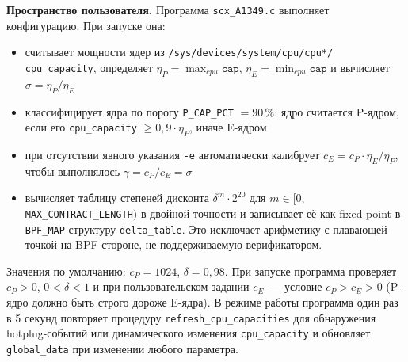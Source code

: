\documentclass[14pt, oneside]{extbook}
\begin{document}
        \textbf{Пространство пользователя.}
        Программа \texttt{scx\_A1349.c} выполняет
        конфигурацию. При запуске она:
        \begin{itemize}
                \item считывает мощности ядер из
                        \texttt{/sys/devices/system/cpu/cpu*/}
                        \texttt{cpu\_capacity},
                        определяет
                        $\eta_P = \max_{cpu} \texttt{cap}$,
                        $\eta_E = \min_{cpu} \texttt{cap}$ и
                        вычисляет $\sigma = \eta_P/\eta_E$
                \item классифицирует ядра по порогу
                        \texttt{P\_CAP\_PCT} $= 90\,\%$: ядро
                        считается P-ядром, если его
                        \texttt{cpu\_capacity} $\geq 0{,}9
                        \cdot \eta_P$, иначе E-ядром
                \item при отсутствии явного указания
                        \texttt{-e} автоматически калибрует
                        $c_E = c_P \cdot \eta_E / \eta_P$,
                        чтобы выполнялось
                        $\gamma = c_P/c_E = \sigma$
                \item вычисляет таблицу степеней дисконта
                        $\delta^m \cdot 2^{20}$ для
                        $m \in [0,$
                        \texttt{MAX\_\allowbreak CONTRACT\_\allowbreak LENGTH}$)$
                        в двойной точности и записывает её
                        как fixed-point в
                        \texttt{BPF\_\allowbreak MAP}-структуру
                        \texttt{delta\_\allowbreak table}. Это исключает
                        арифметику с плавающей точкой на
                        BPF-стороне, не поддерживаемую
                        верификатором.
        \end{itemize}
        Значения по умолчанию: $c_P = 1024$, $\delta = 0{,}98$.
        При запуске программа проверяет $c_P > 0$, $0 < \delta < 1$
        и при пользовательском задании $c_E$~--- условие
        $c_P > c_E > 0$ (P-ядро должно быть строго дороже
        E-ядра). В режиме работы программа один раз в 5 секунд
        повторяет процедуру \texttt{refresh\_cpu\_capacities}
        для обнаружения hotplug-событий или динамического
        изменения \texttt{cpu\_capacity} и обновляет
        \texttt{global\_data} при изменении любого параметра.
\end{document}
